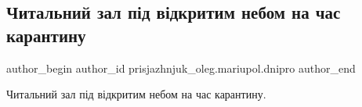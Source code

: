  
 
 
 
 

\subsection{Читальний зал під відкритим небом на час карантину}
\label{sec:30_03_2020.fb.prisjazhnjuk_oleg.mariupol.dnipro.1.chytalnyj_zal_karantin}

\ifcmt
 author_begin
   author_id prisjazhnjuk_oleg.mariupol.dnipro
 author_end
\fi

Читальний зал під відкритим небом на час карантину.

